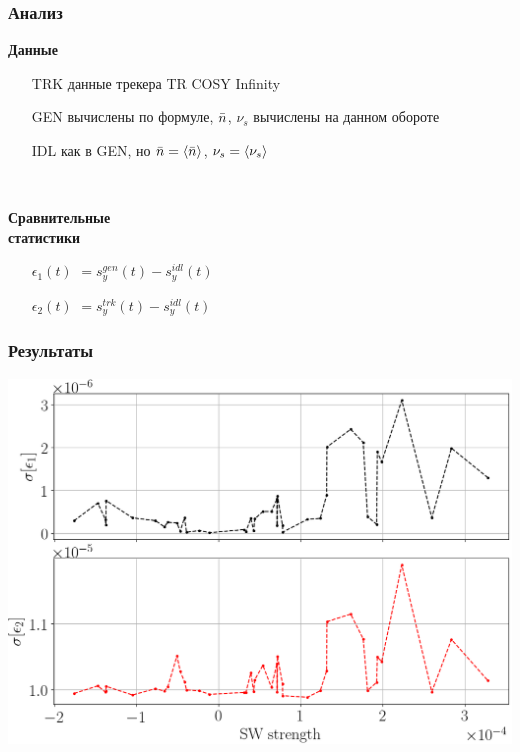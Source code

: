 \documentclass[14pt]{beamer}
\begin{document}
\begin{frame}\frametitle{Анализ}
	\begin{minipage}[t]{.5\linewidth}
		\textbf{Данные}
		\begin{itemize}
			\item[TRK] данные трекера TR COSY Infinity
			\item[GEN] вычислены по формуле, $\bar n$, $\nu_s$ вычислены на данном обороте
			\item[IDL] как в GEN, но $\nbar = \avg{\nbar}$, $\nu_s = \avg{\nu_s}$ 
		\end{itemize}
	\end{minipage}~~~~
	\begin{minipage}[t]{.5\linewidth}
		\textbf{Сравнительные\\ статистики}
		\begin{itemize}
			\item[$\epsilon_1(t)$] $= s_y^{gen}(t) - s_y^{idl}(t)$
			\item[$\epsilon_2(t)$] $= s_y^{trk}(t) - s_y^{idl}(t)$
		\end{itemize}
\end{minipage}
\end{frame}
\begin{frame}\frametitle{Результаты}
	\includegraphics[width=\linewidth]{smp_sim/residual_SD_vs_SW(both)}
\end{frame}
\end{document}
